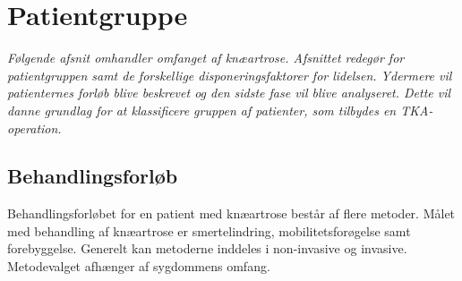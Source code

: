 \section{Patientgruppe}
\textit{Følgende afsnit omhandler omfanget af knæartrose. Afsnittet redegør for patientgruppen samt de forskellige disponeringsfaktorer for lidelsen. Ydermere vil patienternes forløb blive beskrevet og den sidste fase vil blive analyseret. Dette vil danne grundlag for at klassificere gruppen af patienter, som tilbydes en TKA-operation.}

\subsection{Behandlingsforløb}
Behandlingsforløbet for en patient med knæartrose består af flere metoder. Målet med behandling af knæartrose er smertelindring, mobilitetsforøgelse samt forebyggelse. Generelt kan metoderne inddeles i non-invasive og invasive. Metodevalget afhænger af sygdommens omfang. \citep{Lind2016b}

